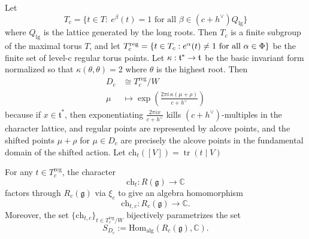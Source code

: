 \documentclass[12pt]{article}
\begin{document}
Let \[T_c=\{t\in T:\ e^\beta(t)=1 \text{ for all } \beta\in (c+h^\vee)Q_{\mathrm{lg}}\}\] where \(Q_{\mathrm{lg}}\) is the lattice generated by the long roots. Then \(T_c\) is a finite subgroup of the maximal torus \(T\), and let \(T_c^{\mathrm{reg}} = \{t\in T_c : e^\alpha(t)\neq 1 \text{ for all } \alpha\in \Phi\}\)
 be the finite set of level-c regular torus points. Let $\kappa:\mathfrak{t}^*\to \mathfrak{t}$ be the basic invariant form normalized so that $\kappa(\theta,\theta)=2$ where $\theta$ is the highest root. Then 
 \begin{align*}
    D_c &\cong T_c^{\mathrm{reg}}/W \\
    \mu &\mapsto \exp\left( \frac{2\pi i\,\kappa(\mu+\rho)}{c+h^\vee} \right)
 \end{align*} because if $x\in \mathfrak t^*$, then exponentiating
$\frac{2\pi i x}{c+h^\vee}$
kills $(c+h^\vee)$-multiples in the character lattice, and regular points are represented by alcove points, and the shifted points $\mu + \rho$ for $\mu \in D_c$ are precisely the alcove points in the fundamental domain of the shifted action. Let $\mathrm{ch}_t([V])=\operatorname{tr}(t\mid V)$

\begin{corollary}
For any $t \in T_c^{\mathrm{reg}}$, the character
\[
\mathrm{ch}_t : R(\mathfrak g) \to \mathbb C
\]
factors through $R_c(\mathfrak g)$ via $\xi_c$ to give an algebra homomorphism
\[
\mathrm{ch}_{t,c} : R_c(\mathfrak g) \to \mathbb C.
\]
Moreover, the set $\{\mathrm{ch}_{t,c}\}_{t \in T_c^{\mathrm{reg}}/W}$ bijectively parametrizes the set
\[
S_{D_c} := \mathrm{Hom}_{\mathrm{alg}}(R_c(\mathfrak g), \mathbb C).
\]
\end{corollary}
\end{document}
